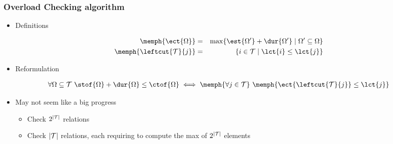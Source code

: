 


\begin{frame}
\frametitle{Overload Checking algorithm~}

\begin{itemize}
	\item Definitions
\end{itemize}
\begin{eqnarray*}
	\memph{\ect{\Omega}} &=& \max\{\est{\Omega'} + \dur{\Omega'} \mid \Omega' \subseteq \Omega\} \\
	\memph{\leftcut{{\cal T}}{j}} &=& \{i \in {\cal T} \mid \lct{i} \leq \lct{j}\}
\end{eqnarray*}

\begin{itemize}
	\item Reformulation
\end{itemize}
\begin{eqnarray*}
	\forall \Omega \subseteq {\cal T}~ \stof{\Omega} + \dur{\Omega} \leq \ctof{\Omega}  \iff
	\memph{\forall j \in {\cal T}}~ \memph{\ect{\leftcut{{\cal T}}{j}} \leq \lct{j}}
\end{eqnarray*}

\begin{itemize}
	\item May not seem like a big progress
	\begin{itemize}
		\item Check $2^{|{\cal T}|}$ relations
		\item Check $|{\cal T}|$ relations, each requiring to compute the max of $2^{|{\cal T}|}$ elements
	\end{itemize}
\end{itemize}

\end{frame}


